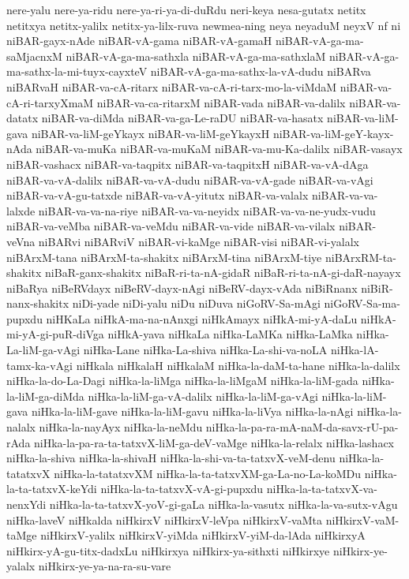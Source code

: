 {nere-yalu
nere-ya-ridu
nere-ya-ri-ya-di-duRdu
neri-keya
nesa-gutatx
netitx
netitxya
netitx-yalilx
netitx-ya-lilx-ruva
newmea-ning
neya
neyaduM
neyxV
nf
ni
niBAR-gayx-nAde
niBAR-vA-gama
niBAR-vA-gamaH
niBAR-vA-ga-ma-saMjacnxM
niBAR-vA-ga-ma-sathxla
niBAR-vA-ga-ma-sathxlaM
niBAR-vA-ga-ma-sathx-la-mi-tuyx-cayxteV
niBAR-vA-ga-ma-sathx-la-vA-dudu
niBARva
niBARvaH
niBAR-va-cA-ritarx
niBAR-va-cA-ri-tarx-mo-la-viMdaM
niBAR-va-cA-ri-tarxyXmaM
niBAR-va-ca-ritarxM
niBAR-vada
niBAR-va-dalilx
niBAR-va-datatx
niBAR-va-diMda
niBAR-va-ga-Le-raDU
niBAR-va-hasatx
niBAR-va-liM-gava
niBAR-va-liM-geYkayx
niBAR-va-liM-geYkayxH
niBAR-va-liM-geY-kayx-nAda
niBAR-va-muKa
niBAR-va-muKaM
niBAR-va-mu-Ka-dalilx
niBAR-vasayx
niBAR-vashacx
niBAR-va-taqpitx
niBAR-va-taqpitxH
niBAR-va-vA-dAga
niBAR-va-vA-dalilx
niBAR-va-vA-dudu
niBAR-va-vA-gade
niBAR-va-vAgi
niBAR-va-vA-gu-tatxde
niBAR-va-vA-yitutx
niBAR-va-valalx
niBAR-va-va-lalxde
niBAR-va-va-na-riye
niBAR-va-va-neyidx
niBAR-va-va-ne-yudx-vudu
niBAR-va-veMba
niBAR-va-veMdu
niBAR-va-vide
niBAR-va-vilalx
niBAR-veVna
niBARvi
niBARviV
niBAR-vi-kaMge
niBAR-visi
niBAR-vi-yalalx
niBArxM-tana
niBArxM-ta-shakitx
niBArxM-tina
niBArxM-tiye
niBArxRM-ta-shakitx
niBaR-ganx-shakitx
niBaR-ri-ta-nA-gidaR
niBaR-ri-ta-nA-gi-daR-nayayx
niBaRya
niBeRVdayx
niBeRV-dayx-nAgi
niBeRV-dayx-vAda
niBiRnanx
niBiR-nanx-shakitx
niDi-yade
niDi-yalu
niDu
niDuva
niGoRV-Sa-mAgi
niGoRV-Sa-ma-pupxdu
niHKaLa
niHkA-ma-na-nAnxgi
niHkAmayx
niHkA-mi-yA-daLu
niHkA-mi-yA-gi-puR-diVga
niHkA-yava
niHkaLa
niHka-LaMKa
niHka-LaMka
niHka-La-liM-ga-vAgi
niHka-Lane
niHka-La-shiva
niHka-La-shi-va-noLA
niHka-lA-tamx-ka-vAgi
niHkala
niHkalaH
niHkalaM
niHka-la-daM-ta-hane
niHka-la-dalilx
niHka-la-do-La-Dagi
niHka-la-liMga
niHka-la-liMgaM
niHka-la-liM-gada
niHka-la-liM-ga-diMda
niHka-la-liM-ga-vA-dalilx
niHka-la-liM-ga-vAgi
niHka-la-liM-gava
niHka-la-liM-gave
niHka-la-liM-gavu
niHka-la-liVya
niHka-la-nAgi
niHka-la-nalalx
niHka-la-nayAyx
niHka-la-neMdu
niHka-la-pa-ra-mA-naM-da-savx-rU-pa-rAda
niHka-la-pa-ra-ta-tatxvX-liM-ga-deV-vaMge
niHka-la-relalx
niHka-lashacx
niHka-la-shiva
niHka-la-shivaH
niHka-la-shi-va-ta-tatxvX-veM-denu
niHka-la-tatatxvX
niHka-la-tatatxvXM
niHka-la-ta-tatxvXM-ga-La-no-La-koMDu
niHka-la-ta-tatxvX-keYdi
niHka-la-ta-tatxvX-vA-gi-pupxdu
niHka-la-ta-tatxvX-va-nenxYdi
niHka-la-ta-tatxvX-yoV-gi-gaLa
niHka-la-vasutx
niHka-la-va-sutx-vAgu
niHka-laveV
niHkalda
niHkirxV
niHkirxV-leVpa
niHkirxV-vaMta
niHkirxV-vaM-taMge
niHkirxV-yalilx
niHkirxV-yiMda
niHkirxV-yiM-da-lAda
niHkirxyA
niHkirx-yA-gu-titx-dadxLu
niHkirxya
niHkirx-ya-sithxti
niHkirxye
niHkirx-ye-yalalx
niHkirx-ye-ya-na-ra-su-vare
}
